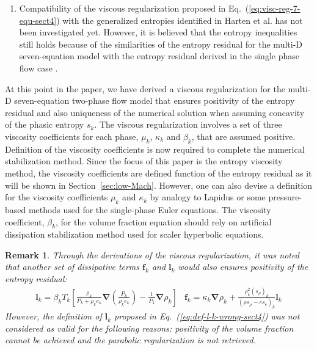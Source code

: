 \documentclass[preprint,10pt]{elsarticle}
\newcommand{\grad}{\mbold{\nabla}}
\newcommand{\mbold}[1]{\boldsymbol#1}
\newtheorem*{remark}{Remark}
\newcommand{\eqt}[1]{Eq.~(\ref{#1})}                     %
\newcommand{\sct}[1]{Section~\ref{#1}}                   %
\newcommand{\tcr}[1]{\textcolor{red}{#1}}
\newcommand{\tcb}[1]{\textcolor{blue}{#1}}
\begin{document}
\begin{enumerate}
\item{Compatibility of the viscous regularization proposed in \eqt{eq:visc-reg-7-equ-sect4} with the generalized entropies identified in Harten et al. \cite{Harten} has not been investigated yet. However, it is believed that the entropy inequalities still holds because of the similarities of the entropy residual for the multi-D seven-equation model with the entropy residual derived in the single phase flow case \cite{jlg}.} 
\end{enumerate}
%
At this point in the paper, we have derived a viscous regularization for the multi-D seven-equation two-phase flow model that ensures positivity of the entropy residual and also uniqueness of the numerical solution when assuming concavity of the phasic entropy $s_k$. The viscous regularization involves a set of three viscosity coefficients for each phase, $\mu_k$, $\kappa_k$ and $\beta_k$, that are assumed positive. Definition of the viscosity coefficients is now required to complete the numerical stabilization method. Since the focus of this paper is the entropy viscosity method, the viscosity coefficients are defined function of the entropy residual as it will be shown in \sct{sec:low-Mach}. However, one can also devise a definition for the viscosity coefficients $\mu_k$ and $\kappa_k$ by analogy to Lapidus \cite{Lapidus_paper, Lapidus_book} or some pressure-based methods \cite{PBV_book} used for the single-phase Euler equations. The viscosity coefficient, $\beta_k$, for the volume fraction equation should rely on artificial dissipation stabilization method used for scaler hyperbolic equations.
%
\begin{remark}
Through the derivations of the viscous regularization, it was noted that another set of dissipative terms $\mbold f_k$ and $\mbold l_k$ would also ensures positivity of the entropy residual:
%
\begin{subequations}
\begin{align}\label{eq:def-l-k-wrong-sect4}
\mbold l_k =\beta_k T_k \left[ \frac{\rho_k}{P_k+\rho_k e_k} \grad \left( \frac{P_k}{\rho_k e_k} \right) - \frac{1}{P_k} \grad \rho_k \right]
\end{align}
\begin{align}
\mbold f_k = \kappa_k \grad \rho_k +  \frac{\rho^2_k (s_{\rho})_k}{\left( \rho s_{\rho} - e s_e \right)_k} \mbold l_k
\end{align}
\end{subequations}
%
However, the definition of $\mbold l_k$ proposed in \eqt{eq:def-l-k-wrong-sect4} was not considered as valid for the following reasons: positivity of the volume fraction cannot be achieved and the parabolic regularization is not retrieved.
\end{remark}
%
\end{document}
